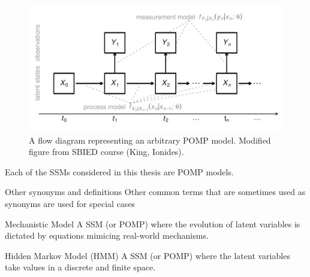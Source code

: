\documentclass[aspectratio=169]{beamer}\usepackage[]{graphicx}\usepackage[]{xcolor}
\makeatletter
\def\maxwidth{ %
  \ifdim\Gin@nat@width>\linewidth
    \linewidth
  \else
    \Gin@nat@width
  \fi
}
\newenvironment{knitrout}{}{} %
\makeatother
\begin{document}
\begin{frame}
\begin{figure}[!ht]
\begin{knitrout}
\color{fgcolor}
\includegraphics[width=0.75\maxwidth]{figure/pompDiagram-1} 
\end{knitrout}
\caption{\label{fig:pompDiagram}A flow diagram representing an arbitrary POMP model. Modified figure from SBIED course (King, Ionides).}
\end{figure}

Each of the SSMs considered in this thesis are POMP models.

\end{frame}

\begin{frame}{Other synonyms and definitions}
  Other common terms that are sometimes used as synonyms are used for special cases 
  \begin{block}{Mechanistic Model}
    A SSM (or POMP) where the evolution of latent variables is dictated by equations mimicing real-world mechanisms. 
  \end{block}
  
  \begin{block}{Hidden Markov Model (HMM)}
    A SSM (or POMP) where the latent variables take values in a discrete and finite space.
  \end{block}
  
\end{frame}
\end{document}

